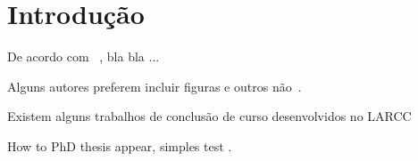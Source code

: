 \chapter*{Introdução} \label{chap:intro}




\lipsum[2-4]

\cite{larcc}


De acordo com ~\cite{larcc:intra-cloud_networking_cloudstack:PDP:17}, bla bla ...


Alguns autores preferem incluir figuras e outros não~\citep{larcc:parsec_cloudstack_lxc_kvm:ISCC:2018}.


Existem alguns trabalhos de conclusão de curso desenvolvidos no LARCC~\citep{larcc:dinei_nadine:TCC:17,larcc:anderson_willian:TCC:17,larcc:bruna_eduardo:TCC:13,larcc:charles_stein:TCC:18}



How to PhD thesis appear, simples test \citep[p. 23]{GRIEBLER:PHD:16}.

